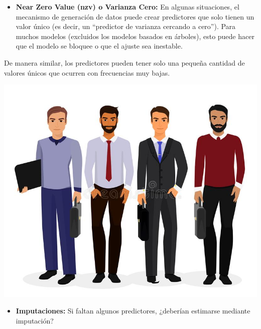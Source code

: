 \documentclass[
]{book}
\providecommand{\tightlist}{%
  \setlength{\itemsep}{0pt}\setlength{\parskip}{0pt}}
\begin{document}
\begin{itemize}
\tightlist
\item
  \textbf{Near Zero Value (nzv) o Varianza Cero:} En algunas situaciones, el mecanismo de generación de datos puede crear predictores que solo tienen un valor único (es decir, un ``predictor de varianza cercando a cero''). Para muchos modelos (excluidos los modelos basados en árboles), esto puede hacer que el modelo se bloquee o que el ajuste sea inestable.
\end{itemize}

De manera similar, los predictores pueden tener solo una pequeña cantidad de valores únicos que ocurren con frecuencias muy bajas.

\begin{center}\includegraphics[width=500pt]{img/04-ml/hombres} \end{center}

\begin{itemize}
\tightlist
\item
  \textbf{Imputaciones:} Si faltan algunos predictores, ¿deberían estimarse mediante imputación?
\end{itemize}
\end{document}
